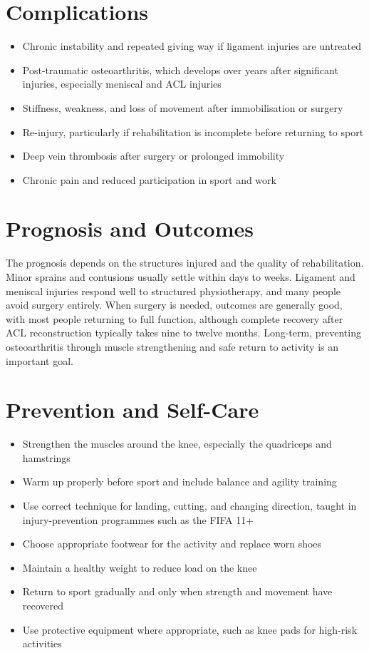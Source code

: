 \section*{Complications}
\begin{itemize}
    \item Chronic instability and repeated giving way if ligament injuries are untreated
    \item Post-traumatic osteoarthritis, which develops over years after significant injuries, especially meniscal and ACL injuries
    \item Stiffness, weakness, and loss of movement after immobilisation or surgery
    \item Re-injury, particularly if rehabilitation is incomplete before returning to sport
    \item Deep vein thrombosis after surgery or prolonged immobility
    \item Chronic pain and reduced participation in sport and work
\end{itemize}

\section*{Prognosis and Outcomes}
The prognosis depends on the structures injured and the quality of rehabilitation. Minor sprains and contusions usually settle within days to weeks. Ligament and meniscal injuries respond well to structured physiotherapy, and many people avoid surgery entirely. When surgery is needed, outcomes are generally good, with most people returning to full function, although complete recovery after ACL reconstruction typically takes nine to twelve months. Long-term, preventing osteoarthritis through muscle strengthening and safe return to activity is an important goal.

\section*{Prevention and Self-Care}
\begin{itemize}
    \item Strengthen the muscles around the knee, especially the quadriceps and hamstrings
    \item Warm up properly before sport and include balance and agility training
    \item Use correct technique for landing, cutting, and changing direction, taught in injury-prevention programmes such as the FIFA 11+
    \item Choose appropriate footwear for the activity and replace worn shoes
    \item Maintain a healthy weight to reduce load on the knee
    \item Return to sport gradually and only when strength and movement have recovered
    \item Use protective equipment where appropriate, such as knee pads for high-risk activities
\end{itemize}

